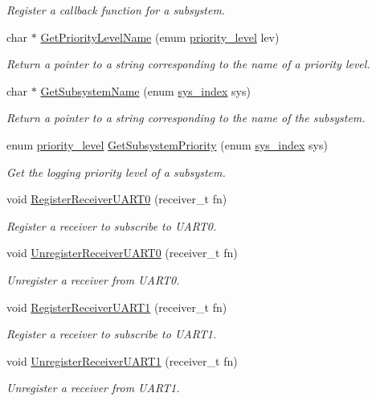 \begin{DoxyCompactItemize}
\begin{DoxyCompactList}\small\item\em Register a callback function for a subsystem. \end{DoxyCompactList}\item 
char $\ast$ \hyperlink{group__subsys_ga3e80779de12bce5e580cf22057427252}{Get\+Priority\+Level\+Name} (enum \hyperlink{group__subsys_ga1d309594956a828563f9181d766daa08}{priority\+\_\+level} lev)
\begin{DoxyCompactList}\small\item\em Return a pointer to a string corresponding to the name of a priority level. \end{DoxyCompactList}\item 
char $\ast$ \hyperlink{group__subsys_ga5e63d8d7c86e335b6d626c216e4acdc7}{Get\+Subsystem\+Name} (enum \hyperlink{group__subsys_gadc5d9f07ddb402114afea1177fc9301b}{sys\+\_\+index} sys)
\begin{DoxyCompactList}\small\item\em Return a pointer to a string corresponding to the name of the subsystem. \end{DoxyCompactList}\item 
enum \hyperlink{group__subsys_ga1d309594956a828563f9181d766daa08}{priority\+\_\+level} \hyperlink{group__subsys_ga4a2dc0fcdac8af77bdb6fdcc77ceb585}{Get\+Subsystem\+Priority} (enum \hyperlink{group__subsys_gadc5d9f07ddb402114afea1177fc9301b}{sys\+\_\+index} sys)
\begin{DoxyCompactList}\small\item\em Get the logging priority level of a subsystem. \end{DoxyCompactList}\item 
void \hyperlink{group__subsys_gab7e855156a8e0dd9472e2c0e141b268a}{Register\+Receiver\+U\+A\+R\+T0} (receiver\+\_\+t fn)
\begin{DoxyCompactList}\small\item\em Register a receiver to subscribe to U\+A\+R\+T0. \end{DoxyCompactList}\item 
void \hyperlink{group__subsys_ga36215ce96afabbcb83f1a03b13fe0e44}{Unregister\+Receiver\+U\+A\+R\+T0} (receiver\+\_\+t fn)
\begin{DoxyCompactList}\small\item\em Unregister a receiver from U\+A\+R\+T0. \end{DoxyCompactList}\item 
void \hyperlink{group__subsys_ga33bcde07b48383dabda400960d652fe3}{Register\+Receiver\+U\+A\+R\+T1} (receiver\+\_\+t fn)
\begin{DoxyCompactList}\small\item\em Register a receiver to subscribe to U\+A\+R\+T1. \end{DoxyCompactList}\item 
void \hyperlink{group__subsys_ga92477e997b5d091656dbf8174933a8bb}{Unregister\+Receiver\+U\+A\+R\+T1} (receiver\+\_\+t fn)
\begin{DoxyCompactList}\small\item\em Unregister a receiver from U\+A\+R\+T1. \end{DoxyCompactList}\end{DoxyCompactItemize}
